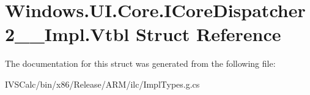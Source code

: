 \hypertarget{struct_windows_1_1_u_i_1_1_core_1_1_i_core_dispatcher2_____impl_1_1_vtbl}{}\section{Windows.\+U\+I.\+Core.\+I\+Core\+Dispatcher2\+\_\+\+\_\+\+Impl.\+Vtbl Struct Reference}
\label{struct_windows_1_1_u_i_1_1_core_1_1_i_core_dispatcher2_____impl_1_1_vtbl}


The documentation for this struct was generated from the following file\+:\begin{DoxyCompactItemize}
\item 
I\+V\+S\+Calc/bin/x86/\+Release/\+A\+R\+M/ilc/Impl\+Types.\+g.\+cs\end{DoxyCompactItemize}
